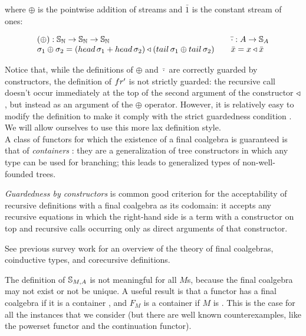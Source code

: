 where $\oplus$ is the pointwise addition of streams and $\bar{1}$ is the constant stream of ones:

$$
\begin{array}{l}
(\oplus): \stream{\nat}\rightarrow \stream{\nat}\rightarrow \stream{\nat}\\
\sigma_1 \oplus \sigma_2 = (\head\,\sigma_1 + \head\,\sigma_2) \scons (\tail\,\sigma_1 \oplus \tail\,\sigma_2)
\end{array}
\quad
\begin{array}{l}
\bar{\cdot}: A \rightarrow \stream{A}\\
\bar{x} = x \scons \bar{x}
\end{array}
$$

Notice that, while the definitions of $\oplus$ and $\bar{\cdot}$ are correctly guarded by constructors, the definition of $\sfp$ is not strictly guarded: the recursive call doesn't occur immediately at the top of the second argument of the constructor $\triangleleft$, but instead as an argument of the $\oplus$ operator.
However, it is relatively easy to modify the definition to make it comply with the strict guardedness condition \cite{capretta:2011}.
We will allow ourselves to use this more lax definition style. \\

A class of functors for which the existence of a final coalgebra is guaranteed is that of {\em containers} \cite{AAG:2005}: they are a generalization of tree constructors in which any type can be used for branching; this leads to generalized types of non-well-founded trees.

{\em Guardedness by constructors} is common good criterion for the acceptability of recursive definitions with a final coalgebra as its codomain: it accepts any recursive equations in which the right-hand side is a term with a constructor on top and recursive calls occurring only as direct arguments of that constructor.

See previous survey work \cite{capretta:2011} for an overview of the theory of final coalgebras, coinductive types, and corecursive definitions.

The definition of $\mathbb{S}_{M,A}$ is not meaningful for all $M$s, because the final coalgebra may not exist or not be unique.
A useful result is that a functor has a final coalgebra if it is a container \cite{AAG:2005}, and $F_M$ is a container if $M$ is \cite{capretta/fowler:2017}.
This is the case for all the instances that we consider (but there are well known counterexamples, like the powerset functor and the continuation functor).

